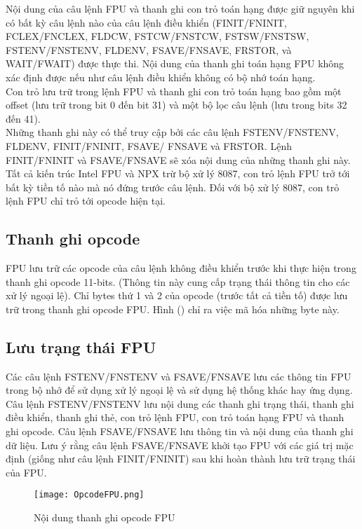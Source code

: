 	Nội dung của câu lệnh FPU và thanh ghi con trỏ toán hạng được giữ nguyên khi có bất kỳ câu lệnh nào của câu lệnh điều khiển (FINIT/FNINIT, FCLEX/FNCLEX, FLDCW, FSTCW/FNSTCW, FSTSW/FNSTSW, FSTENV/FNSTENV, FLDENV, FSAVE/FNSAVE, FRSTOR, và WAIT/FWAIT) được thực thi. Nội dung của thanh ghi toán hạng FPU không xác định được nếu như câu lệnh điều khiển không có bộ nhớ toán hạng.\\
	
 	Con trỏ lưu trữ trong lệnh FPU và thanh ghi con trỏ toán hạng bao gồm một offset (lưu trữ trong bit 0 đến bit 31) và một bộ lọc câu lệnh (lưu trong bits 32 đến 41). \\
 	
	Những thanh ghi này có thể truy cập bởi các câu lệnh FSTENV/FNSTENV, FLDENV, FINIT/FNINIT, FSAVE/ FNSAVE và FRSTOR. Lệnh FINIT/FNINIT và FSAVE/FNSAVE sẽ xóa nội dung của những thanh ghi này.\\
	
	Tất cả kiến trúc Intel FPU và NPX trừ bộ xử lý 8087, con trỏ lệnh FPU trở tới bất kỳ tiền tố nào mà nó đứng trước câu lệnh. Đối với bộ xử lý 8087, con trỏ lệnh FPU chỉ trỏ tới opcode hiện tại.
	
 		\subsection*{Thanh ghi opcode}
	FPU lưu trữ các opcode của câu lệnh không điều khiển trước khi thực hiện trong thanh ghi opcode 11-bits. (Thông tin này cung cấp trạng thái thông tin cho các xử lý ngoại lệ). Chỉ bytes thứ 1 và 2 của opcode (trước tất cả tiền tố) được lưu trữ trong thanh ghi opcode FPU. Hình () chỉ ra việc mã hóa những byte này.
	
		\subsection*{ Lưu trạng thái FPU}
	Các câu lệnh FSTENV/FNSTENV và FSAVE/FNSAVE lưu các thông tin FPU trong bộ nhớ để sử dụng xử lý ngoại lệ và sử dụng hệ thống khác hay ứng dụng. Câu lệnh FSTENV/FNSTENV lưu nội dung các thanh ghi trạng thái, thanh ghi điều khiển, thanh ghi thẻ, con trỏ lệnh FPU, con trỏ toán hạng FPU và thanh ghi opcode. Câu lệnh FSAVE/FNSAVE lưu thông tin và nội dung của thanh ghi dữ liệu. Lưu ý rằng câu lệnh FSAVE/FNSAVE khởi tạo FPU với các giá trị mặc định (giống như câu lệnh FINIT/FNINIT) sau khi hoàn thành lưu trữ trạng thái của FPU.
	\begin{center}
			\begin{figure}[htp]
				\begin{center}
					\texttt{[image: OpcodeFPU.png]}
				\end{center}
				\caption{Nội dung thanh ghi opcode FPU}				
				\label{fig:OpFPU}				
			\end{figure}
		\end{center}	


